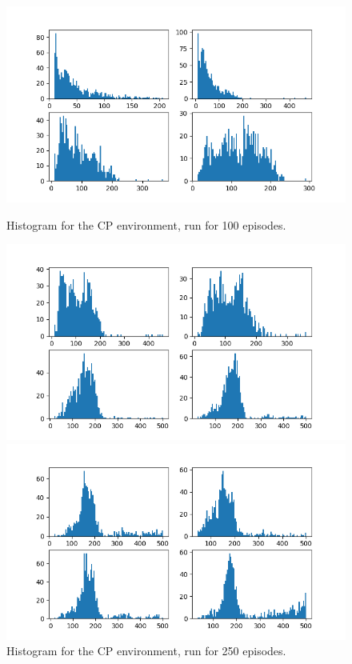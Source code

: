 \documentclass[hidelinks,journal]{IEEEtran}
\begin{document}
\begin{figure}[p]
  \centering
  \includegraphics[scale=0.45]{graph/cp1ResHist.png}
  \caption{Histogram for the CP environment, run for 100 episodes.}
  \label{fig:cp1ResHist}
  \includegraphics[scale=0.45]{graph/cp2ResHist.png}
  \caption{Histogram for the CP environment, run for 250 episodes.}
  \label{fig:cp2ResHist}
  \includegraphics[scale=0.45]{graph/cp3ResHist.png}

\end{figure}
\end{document}
